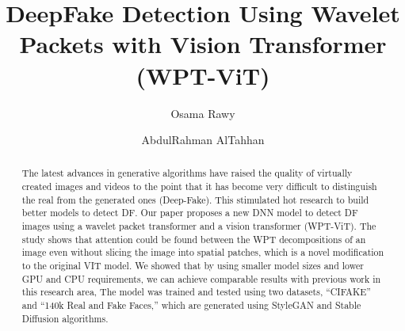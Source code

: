 \documentclass{svproc}
\begin{document}
\mainmatter		 %
%
\title{DeepFake Detection Using Wavelet Packets with Vision Transformer
  (WPT-ViT)}
%
%
\author{Osama Rawy \and AbdulRahman AlTahhan}
%
%
%

\maketitle		%

\begin{abstract}
  The latest advances in generative algorithms have raised the quality of
  virtually created images and videos to the point that it has become very
  difficult to distinguish the real from the generated ones (Deep-Fake). This
  stimulated hot research to build better models to detect DF.	Our paper
  proposes a new DNN model to detect DF images using a wavelet packet
  transformer
  and a vision transformer (WPT-ViT). The study shows that attention could be
  found between the WPT decompositions of an image even without slicing the
  image
  into spatial patches, which is a novel modification to the original VIT
  model.
  We showed that by using smaller model sizes and lower GPU and CPU
  requirements,
  we can achieve comparable results with previous work in this research area,
  The
  model was trained and tested using two datasets, “CIFAKE” and “140k Real and
  Fake Faces,” which are generated using StyleGAN and Stable Diffusion
  algorithms.
\end{abstract}
%
\end{document}
